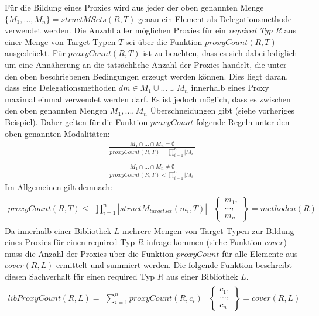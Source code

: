 \noindent
Für die Bildung eines Proxies wird aus jeder der oben genannten Menge $\{M_1,...,M_n\} = structMSets(R,T)$ genau ein Element als Delegationsmethode verwendet werden. Die Anzahl aller möglichen Proxies für ein \emph{required Typ} $R$ aus einer Menge von Target-Typen $T$ sei über die Funktion $\mathit{proxyCount(R,T)}$ ausgedrückt. Für $\mathit{proxyCount(R,T)}$ ist zu beachten, dass es sich dabei lediglich um eine Annäherung an die tatsächliche Anzahl der Proxies handelt, die unter den oben beschriebenen Bedingungen erzeugt werden können. Dies liegt daran, dass eine Delegationsmethoden $dm \in M_1 \cup ... \cup M_n$ innerhalb eines Proxy maximal einmal verwendet werden darf. Es ist jedoch möglich, dass es zwischen den oben genannten Mengen 
$M_1,...,M_n$ Überschneidungen gibt (siehe vorheriges Beispiel). Daher gelten für die Funktion $\mathit{proxyCount}$ folgende Regeln unter den oben genannten Modalitäten:
\begin{gather*}
\frac{M_1 \cap ... \cap M_n = \emptyset}{\mathit{proxyCount(R,T)} = \prod\limits_{i=1}^{n}|M_i| }
\\\\
\frac{M_1 \cap ... \cap M_n \neq \emptyset}{\mathit{proxyCount(R,T)} < \prod\limits_{i=1}^{n}|M_i| }
\end{gather*}
\noindent
Im Allgemeinen gilt demnach:
\begin{gather*}
\mathit{proxyCount(R,T)} \leq 
\begin{array}{l|l}
\prod\limits_{i=1}^{n}|\mathit{structM_{targetset}(m_i, T)}|
&
\left\{
\begin{array}{l}
m_1,\\
...,\\
m_n
\end{array}
\right\}
= \mathit{methoden(R)}
\end{array}
\end{gather*}
Da innerhalb einer Bibliothek $L$ mehrere Mengen von Target-Typen zur Bildung eines Proxies für einen required Typ $R$ infrage kommen (siehe Funktion $\mathit{cover}$) muss die Anzahl der Proxies über die Funktion $\mathit{proxyCount}$ für alle Elemente aus $\mathit{cover(R,L)}$ ermittelt und summiert werden. Die folgende Funktion beschreibt diesen Sachverhalt für einen required Typ $R$ aus einer Bibliothek $L$.
\begin{gather*}
\mathit{libProxyCount(R,L)} = 
\begin{array}{l|l}
\sum_{i=1}^{n}\mathit{proxyCount(R,c_i)}
&
\left\{
\begin{array}{l}
c_1,\\
...,\\
c_n
\end{array}
\right\} = \mathit{cover(R,L)}
\end{array}
\end{gather*}